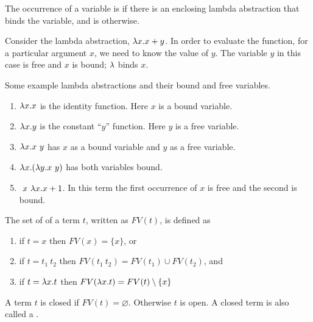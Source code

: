 \begin{flex}
\begin{definition}
\label{def:lcs::bound-and-free}
The occurrence of a variable is  if there is an enclosing
lambda abstraction that binds the variable, and is 
otherwise.
\end{definition}

\begin{example}
Consider the lambda abstraction, $\lambda x. x + y$.  In order to evaluate
the function, for a particular argument $x$, we need to know
the value of $y$.  The variable $y$ in this case is free and $x$
is bound; $\lambda$ binds $x$.  
\end{example}


\begin{example} 
  Some example lambda abstractions and their bound and free variables.
\begin{enumerate}
\item $\lambda x. x$ is the identity function. Here $x$ is a bound variable.
\item $\lambda x. y$ is the constant ``$y$'' function. Here $y$ is a free variable.
\item $\lambda x. x~y$ has $x$ as a bound variable and $y$ as a free variable.
\item $\lambda x. (\lambda y. x~y)$ has both variables bound.
\item $~x~\lambda x. x + 1$.  In this term the first occurrence of $x$ is
  free and the second is bound.
\end{enumerate}
\end{example}
\end{flex}

\begin{definition}
\label{def:lcs::fv}
The set of  of a term $t$, written as $FV(t)$,
is defined as 
\begin{enumerate}
\item if $t = x$ then $FV(x) = \{ x \}$, or
\item if $t = t_1~t_2$ then $FV(t_1~t_2)=FV(t_1) \cup FV(t_2)$, and
\item if $t = \lambda x. t$ then $FV(\lambda x.t)=FV(t) \setminus \{x\}$
\end{enumerate}
\end{definition}

\begin{definition}
\label{def:lcs::open-closed}
A term $t$ is closed if $FV(t) = \varnothing$. Otherwise $t$ is open. 
A closed term is also called a .
\end{definition}


